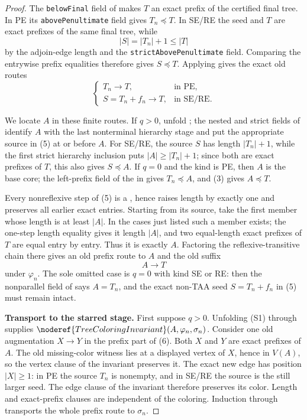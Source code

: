 \begin{proof}
The \texttt{belowFinal} field of  makes
\(T\) an exact prefix of the certified final tree.  In PE its
\texttt{abovePenultimate} field gives \(T_n\preccurlyeq T\).  In SE/RE
the seed and \(T\) are exact prefixes of the same final tree, while
\[
 |S|=|T_n|+1\leq |T|
\]
by the adjoin-edge length and the \texttt{strictAbovePenultimate} field.
Comparing the entrywise prefix equalities therefore gives
\(S\preccurlyeq T\).  Applying
 gives the exact old routes
\[
\begin{cases}
 T_n\longrightarrow T,&\text{in PE},\\
 S=T_n+f_n\longrightarrow T,&\text{in SE/RE}.
\end{cases}                                                     \tag{5}
\]

We locate \(A\) in these finite routes.  If \(q>0\), unfold
; the nested and strict fields of
 identify \(A\) with the last nonterminal
hierarchy stage and put the appropriate source in (5) at or before \(A\).
For SE/RE, the source \(S\) has length \(|T_n|+1\), while the first strict
hierarchy inclusion puts \(|A|\geq |T_n|+1\); since both are exact prefixes
of \(T\), this also gives \(S\preccurlyeq A\).  If \(q=0\) and the kind is
PE, then \(A\) is the base core; the left-prefix field of the
 in  gives
\(T_n\preccurlyeq A\), and (3) gives \(A\preccurlyeq T\).

Every nonreflexive step of (5) is a
, hence raises length by exactly one and
preserves all earlier exact entries.  Starting from its source, take the
first member whose length is at least \(|A|\).  In the cases just listed
such a member exists; the one-step length equality gives it length
\(|A|\), and two equal-length exact prefixes of \(T\) are equal entry by
entry.  Thus it is exactly \(A\).  Factoring the reflexive-transitive chain
there gives an old prefix route to \(A\) and the old suffix
\[
                         A\longrightarrow T                    \tag{6}
\]
under \(\varphi_n\).  The sole omitted case is \(q=0\) with kind SE or RE:
then the nonparallel field of  says \(A=T_n\), and
the exact non-TAA seed \(S=T_n+f_n\) in (5) must remain intact.

\textbf{Transport to the starred stage.}
First suppose \(q>0\).  Unfolding (S1) through
 supplies
\(\noderef{TreeColoringInvariant}(A,\varphi_n,\sigma_n)\).  Consider one
old augmentation \(X\to Y\) in the prefix part of (6).  Both \(X\) and
\(Y\) are exact prefixes of \(A\).  The old missing-color witness lies at
a displayed vertex of \(X\), hence in \(V(A)\), so the vertex clause of
the invariant preserves it.  The exact new edge has position
\(|X|\geq1\): in PE the source \(T_n\) is nonempty, and in SE/RE the source
is the still larger seed.  The edge clause of the invariant therefore
preserves its color.  Length and exact-prefix clauses are independent of
the coloring.  Induction through
 transports the whole prefix route
to \(\sigma_n\).


\end{proof}
